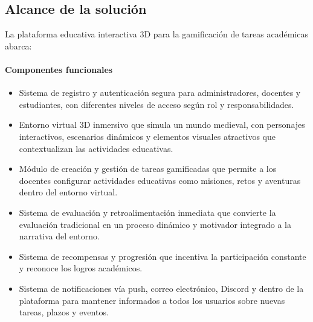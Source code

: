 \subsection{Alcance de la solución}

La plataforma educativa interactiva 3D para la gamificación de tareas académicas abarca:

\paragraph{Componentes funcionales}

\begin{itemize}
\item Sistema de registro y autenticación segura para administradores, docentes y estudiantes, con diferentes niveles de acceso según rol y responsabilidades.
\item Entorno virtual 3D inmersivo que simula un mundo medieval, con personajes interactivos, escenarios dinámicos y elementos visuales atractivos que contextualizan las actividades educativas.
\item Módulo de creación y gestión de tareas gamificadas que permite a los docentes configurar actividades educativas como misiones, retos y aventuras dentro del entorno virtual.
\item Sistema de evaluación y retroalimentación inmediata que convierte la evaluación tradicional en un proceso dinámico y motivador integrado a la narrativa del entorno.
\item Sistema de recompensas y progresión que incentiva la participación constante y reconoce los logros académicos.
\item Sistema de notificaciones vía push, correo electrónico, Discord y dentro de la plataforma para mantener informados a todos los usuarios sobre nuevas tareas, plazos y eventos.
\end{itemize}

